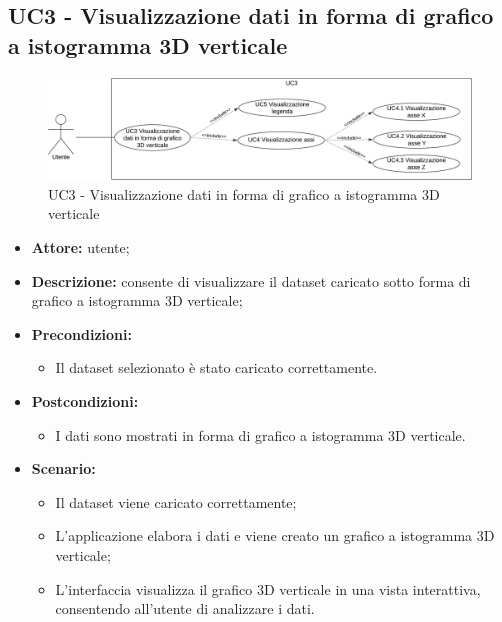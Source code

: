 \subsection{UC3 - Visualizzazione dati in forma di grafico a istogramma 3D verticale}
\begin{figure}[h!]
    \centering
    \includegraphics[scale=0.7]{template/images/UC3.png}
    \caption{UC3 - Visualizzazione dati in forma di grafico a istogramma 3D verticale}
\end{figure}
\begin{itemize}
    \item \textbf{Attore:} utente;
    \item \textbf{Descrizione:} consente di visualizzare il dataset caricato sotto forma di grafico a istogramma 3D verticale;
    \item \textbf{Precondizioni:}
    \begin{itemize}
        \item Il dataset selezionato è stato caricato correttamente.
    \end{itemize}
    \item \textbf{Postcondizioni:}
    \begin{itemize}
        \item I dati sono mostrati in forma di grafico a istogramma 3D verticale.
    \end{itemize}
    \item \textbf{Scenario:}
    \begin{itemize}
        \item Il dataset viene caricato correttamente;
        \item L'applicazione elabora i dati e viene creato un grafico a istogramma 3D verticale;
        \item L'interfaccia visualizza il grafico 3D verticale in una vista interattiva, consentendo all'utente di analizzare i dati.
    \end{itemize}
\end{itemize}
